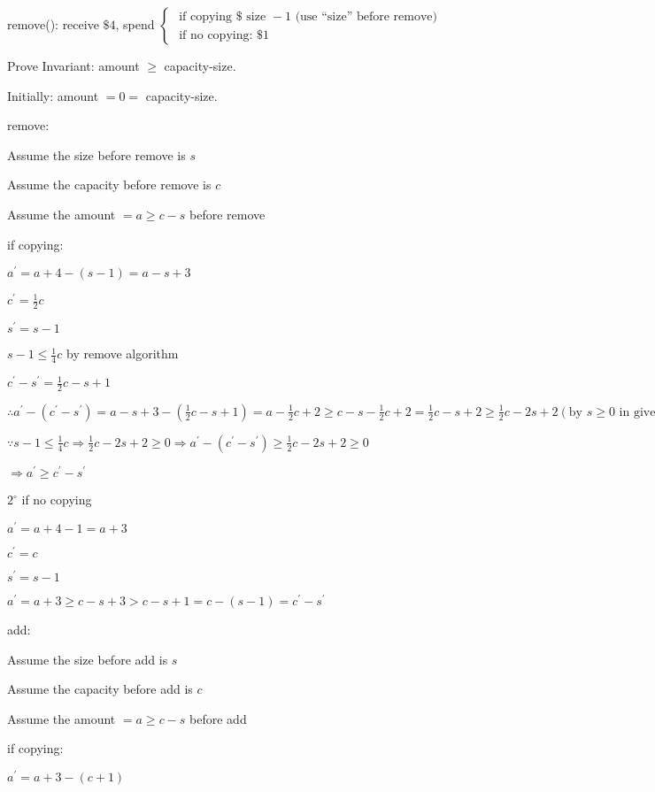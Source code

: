 \documentclass[12pt]{article}
\begin{document}
remove(): receive $\$ 4$, spend $\left\{\begin{array}{l}\text { if copying } \$ \text { size }-1 \text { (use ``size'' before remove) } \\ \text { if no copying: } \$ 1\end{array}\right.$

Prove Invariant: amount $\geq$ capacity-size.

Initially: amount $=0=$ capacity-size.

remove:

Assume the size before remove is $s$

Assume the capacity before remove is $c$

Assume the amount $=a \geqslant c-s$ before remove

if copying:


$ a^{\prime}=a+4-(s-1)=a-s+3 $

$ c^{\prime}=\frac{1}{2} c $

$ s^{\prime}=s-1$


$s-1 \leq \frac{1}{4} c$ by remove algorithm

$ c^{\prime}-s^{\prime}=\frac{1}{2} c-s+1 $

$ \therefore a^{\prime}-\left(c^{\prime}-s^{\prime}\right)=a-s+3-\left(\frac{1}{2} c-s+1\right)=a-\frac{1}{2} c+2 \geqslant c-s-\frac{1}{2} c+2=\frac{1}{2} c-s+2\geqslant \frac{1}{2} c-2 s+2(\text{by } s \ge 0 \text{ in given invariant} ) $

$ \because s-1 \leq \frac{1}{4} c \Rightarrow \frac{1}{2} c-2 s+2 \geqslant 0 \Rightarrow a^{\prime}-\left(c^{\prime}-s^{\prime}\right) \geqslant \frac{1}{2} c-2 s+2 \geqslant 0 $

$ \Rightarrow a^{\prime} \geqslant c^{\prime}-s^{\prime}$


$2^{\circ}$ if no copying

$ a^{\prime}=a+4-1=a+3 $

$ c^{\prime}=c $

$ s^{\prime}=s-1 $

$ a^{\prime}=a+3 \geqslant c-s+3>c-s+1=c-(s-1)=c^{\prime}-s^{\prime}$


add:

Assume the size before add is $s$

Assume the capacity before add is $c$

Assume the amount $=a \geqslant c-s$ before add

if copying:

$ a^{\prime}=a+3-(c+1) $
\end{document}
